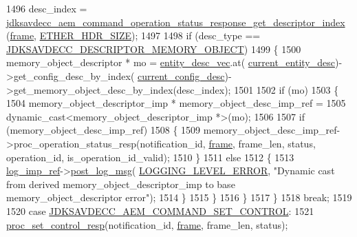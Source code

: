 \begin{DoxyCode}
{{{{1496         desc\_index = 
      \hyperlink{group__command__operation__status__response_ga85ce9d7460dbf29a9b42eb2f0d17aaf7}{jdksavdecc\_aem\_command\_operation\_status\_response\_get\_descriptor\_index}
      (\hyperlink{gst__avb__playbin_8c_ac8e710e0b5e994c0545d75d69868c6f0}{frame}, \hyperlink{namespaceavdecc__lib_a6c827b1a0d973e18119c5e3da518e65ca9512ad9b34302ba7048d88197e0a2dc0}{ETHER\_HDR\_SIZE});
1497 
1498         \textcolor{keywordflow}{if} (desc\_type == \hyperlink{group__descriptor_ga7d2dd5f18460db32b825ce78f19f8135}{JDKSAVDECC\_DESCRIPTOR\_MEMORY\_OBJECT})
1499         \{
1500             memory\_object\_descriptor * mo = \hyperlink{classavdecc__lib_1_1end__station__imp_a72edab41bc56e3c1757944a7df188a3d}{entity\_desc\_vec}.at(
      \hyperlink{classavdecc__lib_1_1end__station__imp_afd78c89df26ba7641e1adb764c0e827d}{current\_entity\_desc})->get\_config\_desc\_by\_index(
      \hyperlink{classavdecc__lib_1_1end__station__imp_a60b1af40d35e8a86b0082c54ab6cb6a8}{current\_config\_desc})->get\_memory\_object\_desc\_by\_index(desc\_index);
1501 
1502             \textcolor{keywordflow}{if} (mo)
1503             \{
1504                 memory\_object\_descriptor\_imp * memory\_object\_desc\_imp\_ref =
1505                     \textcolor{keyword}{dynamic\_cast<}memory\_object\_descriptor\_imp *\textcolor{keyword}{>}(mo);
1506 
1507                 \textcolor{keywordflow}{if} (memory\_object\_desc\_imp\_ref)
1508                 \{
1509                     memory\_object\_desc\_imp\_ref->proc\_operation\_status\_resp(notification\_id, 
      \hyperlink{gst__avb__playbin_8c_ac8e710e0b5e994c0545d75d69868c6f0}{frame}, frame\_len, status, operation\_id, is\_operation\_id\_valid);
1510                 \}
1511                 \textcolor{keywordflow}{else}
1512                 \{
1513                     \hyperlink{namespaceavdecc__lib_acbe3e2a96ae6524943ca532c87a28529}{log\_imp\_ref}->\hyperlink{classavdecc__lib_1_1log_a68139a6297697e4ccebf36ccfd02e44a}{post\_log\_msg}(
      \hyperlink{namespaceavdecc__lib_a501055c431e6872ef46f252ad13f85cdaf2c4481208273451a6f5c7bb9770ec8a}{LOGGING\_LEVEL\_ERROR}, \textcolor{stringliteral}{"Dynamic cast from derived memory\_object\_descriptor\_imp to base
       memory\_object\_descriptor error"});
1514                 \}
1515             \}
1516         \}
1517     \}
1518     \textcolor{keywordflow}{break};
1519 
1520     \textcolor{keywordflow}{case} \hyperlink{group__command_ga78648020206806d2992e010573f0ef27}{JDKSAVDECC\_AEM\_COMMAND\_SET\_CONTROL}:
1521         \hyperlink{classavdecc__lib_1_1end__station__imp_a5ec590aa701ab1dc91e3ef47df951d90}{proc\_set\_control\_resp}(notification\_id, \hyperlink{gst__avb__playbin_8c_ac8e710e0b5e994c0545d75d69868c6f0}{frame}, frame\_len, status);
}}}}
\end{DoxyCode}
